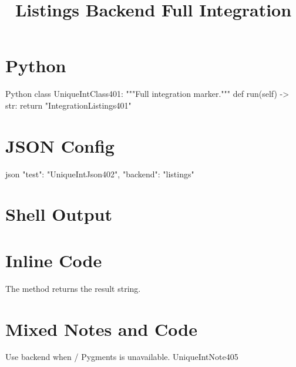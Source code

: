\documentclass[code=listings,titlepage=formal]{SUSTechHomework}
\title{Listings Backend Full Integration}
\begin{document}
\clearauthors
{}

\clearcontributions
{}

\maketitle

\section{Python}

\begin{sustechcode}{Python}
class UniqueIntClass401:
    """Full integration marker."""
    def run(self) -> str:
        return "IntegrationListings401"
\end{sustechcode}

\section{JSON Config}

\begin{sustechcode}{json}
{
  "test": "UniqueIntJson402",
  "backend": "listings"
}
\end{sustechcode}

\section{Shell Output}


\section{Inline Code}

The method  returns the result string.

\section{Mixed Notes and Code}

\begin{sustechnote}[title=Implementation Note]
Use  backend when  / Pygments is unavailable.
UniqueIntNote405
\end{sustechnote}
\end{document}
